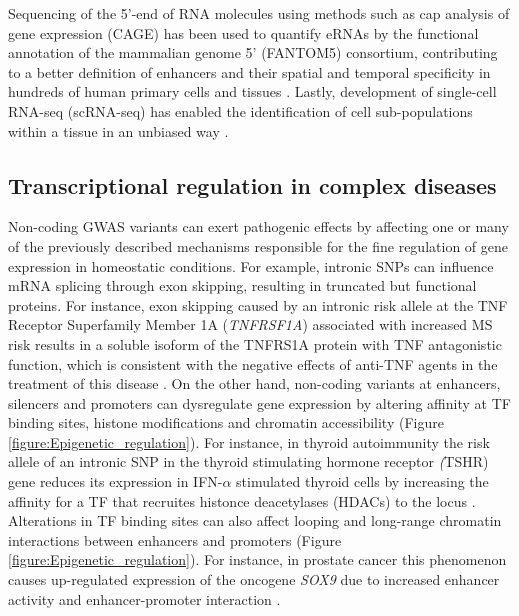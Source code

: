 Sequencing of the  5'-end of RNA molecules using methods such as cap analysis of gene expression (CAGE) has been used to quantify eRNAs by the functional annotation of the mammalian genome 5' (FANTOM5) consortium, contributing to a better definition of enhancers and their spatial and temporal specificity in hundreds of human primary cells and tissues \parencite{FANTOM2014,Andersson2014}. 
Lastly, development of single-cell RNA-seq (scRNA-seq) has enabled the identification of cell sub-populations within a tissue in an unbiased way \parencite{Tang2009, Tang2010}. 


\subsection{Transcriptional regulation in complex diseases}

Non-coding GWAS variants can exert pathogenic effects by affecting one or many of the previously described mechanisms responsible for the fine regulation of gene expression in homeostatic conditions. For example, intronic SNPs can influence mRNA splicing through exon skipping, resulting in truncated but functional proteins. For instance, exon skipping caused by an intronic risk allele at the TNF Receptor Superfamily Member 1A (\textit{TNFRSF1A}) associated with increased MS risk results in a soluble isoform of the TNFRS1A protein with TNF antagonistic function, which is consistent with the negative effects of anti-TNF agents in the treatment of this disease \parencite{Gregory2012}. On the other hand, non-coding variants at enhancers, silencers and promoters can dysregulate gene expression by altering affinity at TF binding sites, histone modifications and chromatin accessibility (Figure \ref{figure:Epigenetic_regulation}). For instance, in thyroid autoimmunity the risk allele of an intronic SNP in the thyroid stimulating hormone receptor \textit(TSHR) gene reduces its expression in IFN-$\alpha$ stimulated thyroid cells by increasing the affinity for a TF that recruites histonce deacetylases (HDACs) to the locus \parencite{Stefan2014}. %
Alterations in TF binding sites can also affect looping and long-range chromatin interactions between enhancers and promoters (Figure \ref{figure:Epigenetic_regulation}). For instance, in prostate cancer this phenomenon causes up-regulated expression of the oncogene \textit{SOX9} due to increased enhancer activity and enhancer-promoter interaction \parencite{Zhang2012}. 

